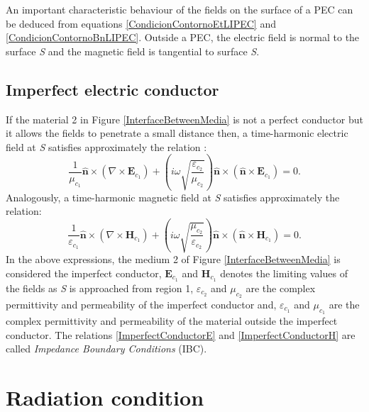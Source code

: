 An important characteristic behaviour of the fields on the surface of a PEC can be deduced from equations \eqref{CondicionContornoEtLIPEC} and \eqref{CondicionContornoBnLIPEC}. Outside a PEC, the electric field is normal to the surface \emph{S} and the magnetic field is tangential to surface \emph{S}.

\subsection{Imperfect electric conductor}\label{sIBCcond}

If the material 2 in Figure \ref{InterfaceBetweenMedia} is not a perfect conductor but it allows the fields to penetrate a small distance then, a time-harmonic electric field at \emph{S} satisfies approximately the relation \cite{Senior, SeniorLibro}:
\begin{equation}\label{ImperfectConductorE}
	\frac{1}{\mu_{c_{1}}}\mathbf{\hat{n}}\times\left(\nabla\times\mathbf{E}_{c_{1}}\right) + \left(i\omega\sqrt{\frac{\varepsilon_{c_{2}}}{\mu_{c_{2}}}}\right) \mathbf{\hat{n}}\times(\mathbf{\hat{n}}\times\mathbf{E}_{c_{1}}) = 0.
\end{equation}
Analogously, a time-harmonic magnetic field at \emph{S} satisfies approximately the relation:
\begin{equation}\label{ImperfectConductorH}
	\frac{1}{\varepsilon_{c_{1}}}\mathbf{\hat{n}}\times\left(\nabla\times\mathbf{H}_{c_{1}}\right) + \left(i\omega\sqrt{\frac{\mu_{c_{2}}}{\varepsilon_{c_{2}}}}\right)\mathbf{\hat{n}}\times\left(\mathbf{\hat{n}}\times\mathbf{H}_{c_{1}}\right) = 0.
\end{equation}
In the above expressions, the medium 2 of Figure \ref{InterfaceBetweenMedia} is considered the imperfect conductor, $\mathbf{E}_{c_{1}}$ and $\mathbf{H}_{c_{1}}$ denotes the limiting values of the fields as \emph{S} is approached from region 1, $\varepsilon_{c_{2}}$ and $\mu_{c_{2}}$ are the complex permittivity and permeability of the imperfect conductor and, $\varepsilon_{c_{1}}$ and $\mu_{c_{1}}$ are the complex permittivity and permeability of the material outside the imperfect conductor. The relations \eqref{ImperfectConductorE} and \eqref{ImperfectConductorH} are called \textit{Impedance Boundary Conditions} (IBC).

\section{Radiation condition}\label{sSMradcond}

